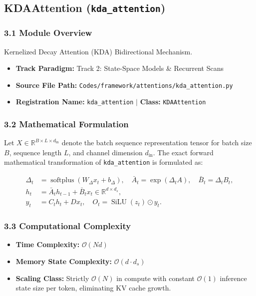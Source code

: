 \subsection{KDAAttention (\texttt{kda\_attention})}
\label{sec:app_module_kda_attention}

\subsubsection*{3.1 Module Overview}
Kernelized Decay Attention (KDA) Bidirectional Mechanism.
\begin{itemize}
    \item \textbf{Track Paradigm:} Track 2: State-Space Models \& Recurrent Scans
    \item \textbf{Source File Path:} \texttt{Codes/framework/attentions/kda\_attention.py}
    \item \textbf{Registration Name:} \texttt{kda\_attention} $\mid$ \textbf{Class:} \texttt{KDAAttention}
\end{itemize}

\subsubsection*{3.2 Mathematical Formulation}
Let $X \in \mathbb{R}^{B \times L \times d_{\text{in}}}$ denote the batch sequence representation tensor for batch size $B$, sequence length $L$, and channel dimension $d_{\text{in}}$. The exact forward mathematical transformation of \texttt{kda\_attention} is formulated as:

\begin{align}
\Delta_t &= \operatorname{softplus}(W_\Delta x_t + b_\Delta), \quad \bar{A}_t = \exp(\Delta_t A), \quad \bar{B}_t = \Delta_t B_t, \\
h_t &= \bar{A}_t h_{t-1} + \bar{B}_t x_t \in \mathbb{R}^{d \times d_s}, \\
y_t &= C_t h_t + D x_t, \quad O_t = \operatorname{SiLU}(z_t) \odot y_t.
\end{align}


\subsubsection*{3.3 Computational Complexity}
\begin{itemize}
    \item \textbf{Time Complexity:} $\mathcal{O}(N d)$
    \item \textbf{Memory State Complexity:} $\mathcal{O}(d \cdot d_s)$
    \item \textbf{Scaling Class:} Strictly $\mathcal{O}(N)$ in compute with constant $\mathcal{O}(1)$ inference state size per token, eliminating KV cache growth.
\end{itemize}

